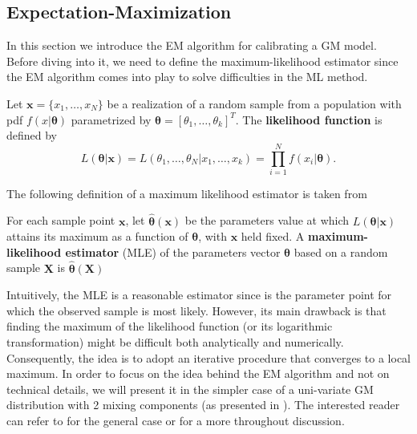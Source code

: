 \subsection{Expectation-Maximization}
In this section we introduce the EM algorithm for calibrating a GM model. Before diving into it, we need to define the maximum-likelihood estimator since the EM algorithm comes into play to solve difficulties in the ML method.
\begin{definition}
	Let $\bm{x}=\{x_1,\ldots,x_N\}$ be a realization of a random sample from a population with pdf $f(x\lvert\bm{\theta})$ parametrized by $\bm{\theta}=[\theta_1,\ldots,\theta_k]^T$. The \textbf{likelihood function} is defined by \[ L(\bm{\theta}\lvert\bm{x}) = L(\theta_1,\ldots,\theta_N\lvert x_1,\ldots,x_k) = \prod_{i=1}^{N}f(x_i\lvert\bm{\theta}). \]	
\end{definition}
The following definition of a maximum likelihood estimator is taken from \cite{casella2002}
\begin{definition}
	For each sample point $\bm{x}$, let $\widehat{\bm{\theta}}(\bm{x})$ be the parameters value at which $L(\bm{\theta}\lvert\bm{x})$  attains its maximum as a function of $\bm{\theta}$, with $\bm{x}$ held fixed. A \textbf{maximum-likelihood estimator} (MLE) of the parameters vector $\bm{\theta}$ based on a random sample $\bm{X}$ is $\widehat{\bm{\theta}}(\bm{X})$
\end{definition}
Intuitively, the MLE is a reasonable estimator since is the parameter point for which the observed sample is most likely. However, its main drawback is that finding the maximum of the likelihood function (or its logarithmic transformation) might be difficult both analytically and numerically. Consequently, the idea is to adopt an iterative procedure that converges to a local maximum.
In order to focus on the idea behind the EM algorithm and not on technical details, we will present it in the simpler case of a uni-variate GM distribution with 2 mixing components (as presented in \cite{hastie2009}). The interested reader can refer to \cite{hastie2009} for the general case or \cite{Plasse2013} for a more throughout discussion.


